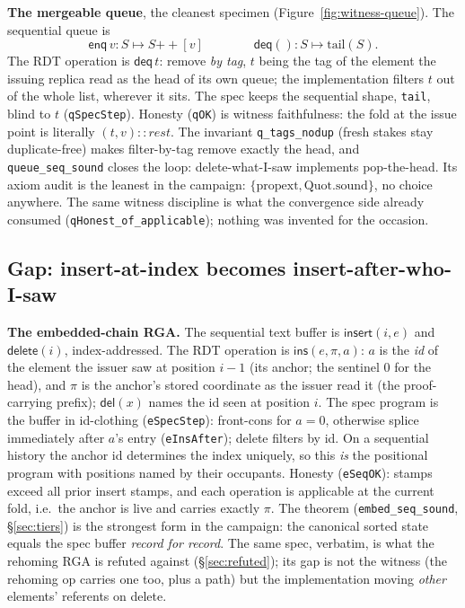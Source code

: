 \documentclass[11pt]{article}
\newcommand{\code}[1]{\texttt{#1}}
\newcommand{\del}{\mathsf{del}}
\newcommand{\ins}{\mathsf{ins}}
\newcommand{\enq}{\mathsf{enq}}
\newcommand{\deq}{\mathsf{deq}}
\begin{document}
\textbf{The mergeable queue}, the cleanest specimen
(Figure~\ref{fig:witness-queue}). The sequential queue is
\[
  \enq\,v : S \mapsto S \mathbin{+\!\!+} [v]
  \qquad\qquad
  \deq() : S \mapsto \mathrm{tail}(S).
\]
The RDT operation is $\deq\,t$: remove \emph{by tag}, $t$ being the
tag of the element the issuing replica read as the head of its own
queue; the implementation filters $t$ out of the whole list, wherever
it sits. The spec keeps the sequential shape, \code{tail}, blind to
$t$ (\code{qSpecStep}). Honesty (\code{qOK}) is witness faithfulness:
the fold at the issue point is literally $(t, v) :: \mathit{rest}$.
The invariant \code{q\_tags\_nodup} (fresh stakes stay duplicate-free)
makes filter-by-tag remove exactly the head, and
\code{queue\_seq\_sound} closes the loop: delete-what-I-saw implements
pop-the-head. Its axiom audit is the leanest in the campaign:
$\{\mathrm{propext}, \mathrm{Quot.sound}\}$, no choice anywhere. The
same witness discipline is what the convergence side already consumed
(\code{qHonest\_of\_applicable}); nothing was invented for the
occasion.

\subsection{Gap: insert-at-index becomes insert-after-who-I-saw}
\label{sec:rga-spec}

\textbf{The embedded-chain RGA.} The sequential text buffer is
$\mathsf{insert}(i, e)$ and $\mathsf{delete}(i)$, index-addressed. The
RDT operation is $\ins(e, \pi, a)$: $a$ is the \emph{id} of the
element the issuer saw at position $i - 1$ (its anchor; the sentinel
$0$ for the head), and $\pi$ is the anchor's stored coordinate as the
issuer read it (the proof-carrying prefix); $\del(x)$ names the id
seen at position $i$. The spec program is the buffer in id-clothing
(\code{eSpecStep}): front-cons for $a = 0$, otherwise splice
immediately after $a$'s entry (\code{eInsAfter}); delete filters by
id. On a sequential history the anchor id determines the index
uniquely, so this \emph{is} the positional program with positions
named by their occupants. Honesty (\code{eSeqOK}): stamps exceed all
prior insert stamps, and each operation is applicable at the current
fold, i.e.\ the anchor is live and carries exactly $\pi$. The theorem
(\code{embed\_seq\_sound}, \S\ref{sec:tiers}) is the strongest form in
the campaign: the canonical sorted state equals the spec buffer
\emph{record for record}. The same spec, verbatim, is what the
rehoming RGA is refuted against (\S\ref{sec:refuted}); its gap is not
the witness (the rehoming op carries one too, plus a path) but the
implementation moving \emph{other} elements' referents on delete.
\end{document}
